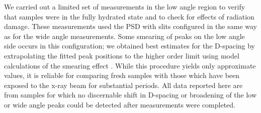 We carried out a limited set of measurements in the low angle region
to verify that samples were in the fully hydrated state and to check
for effects of radiation damage.  These measurements used the PSD
with slits configured in the same way as for the wide angle
measurements.  Some smearing of peaks on the low angle side occurs in
this configuration; we obtained best estimates for the D-spacing by
extrapolating the fitted peak positions to the higher order limit using
model calculations of the smearing effect \cite{STN92}. While this procedure
yields only approximate values, it is reliable for comparing fresh
samples with those which have been exposed to the x-ray beam for
substantial periods.  All data reported here are from samples for
which no discernable shift in D-spacing or broadening of the low or wide
angle peaks could be detected after measurements were completed. 
